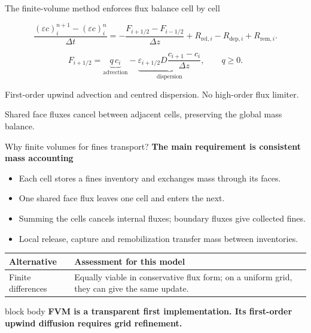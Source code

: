 \documentclass[aspectratio=169,11pt]{beamer}
\newcommand{\hi}[1]{\textcolor{tumblue}{\textbf{#1}}}
\newcommand{\takeaway}[1]{%
  \begin{beamercolorbox}[rounded=true,sep=.55em]{block body}
    \centering\color{tumdark}\textbf{#1}
  \end{beamercolorbox}}
\begin{document}
\begin{frame}{The finite-volume method enforces flux balance cell by cell}
 \centering
 \vspace{.15cm}

\[
\frac{(\varepsilon c)_i^{n+1}-(\varepsilon c)_i^n}{\Delta t}
=
-\frac{F_{i+1/2}-F_{i-1/2}}{\Delta z}
+R_{\mathrm{rel},i}-R_{\mathrm{dep},i}+R_{\mathrm{rem},i}.
\]

\[
F_{i+1/2}
=
\underbrace{q\,c_i}_{\text{advection}}
-
\underbrace{
	\varepsilon_{i+1/2}D
	\frac{c_{i+1}-c_i}{\Delta z}
}_{\text{dispersion}},
\qquad q\geq 0.
\]

\small
First-order upwind advection and centred dispersion. No high-order flux limiter.
\par\medskip Shared face fluxes cancel between adjacent cells, preserving the global mass balance.
\end{frame}

\begin{frame}{Why finite volumes for fines transport?}
\small
\hi{The main requirement is consistent mass accounting}
\begin{itemize}
\item Each cell stores a fines inventory and exchanges mass through its faces.
\item One shared face flux leaves one cell and enters the next.
\item Summing the cells cancels internal fluxes; boundary fluxes give collected fines.
\item Local release, capture and remobilization transfer mass between inventories.
\end{itemize}
\medskip
\begin{tabular}{p{2.5cm}p{9cm}}
\toprule
Alternative & Assessment for this model\\\midrule
Finite differences & Equally viable in conservative flux form; on a uniform grid, they can give the same update.\\\bottomrule
\end{tabular}
\vfill\takeaway{FVM is a transparent first implementation. Its first-order upwind diffusion requires grid refinement.}
\end{frame}
\end{document}
